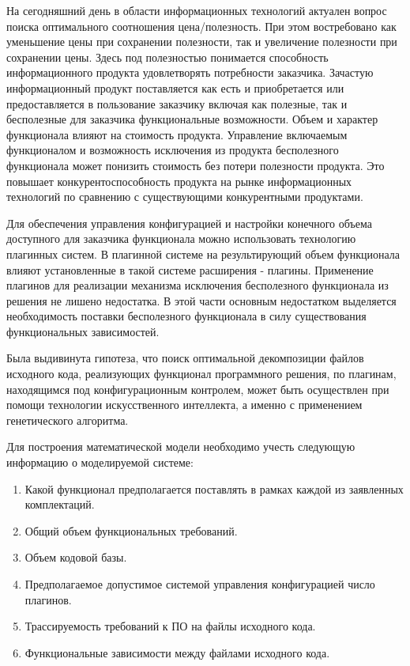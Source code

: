 На сегодняшний день в области информационных технологий актуален вопрос поиска оптимального соотношения цена/полезность. При этом востребовано как уменьшение цены при сохранении полезности, так и увеличение полезности при сохранении цены. Здесь под полезностью понимается способность информационного продукта удовлетворять потребности заказчика. Зачастую информационный продукт поставляется как есть и приобретается или предоставляется в пользование заказчику включая как полезные, так и бесполезные для заказчика функциональные возможности. Объем и характер функционала влияют на стоимость продукта. Управление включаемым функционалом и возможность исключения из продукта бесполезного функционала может понизить стоимость без потери полезности продукта. Это повышает конкурентоспособность продукта на рынке информационных технологий по сравнению с существующими конкурентными продуктами.

Для обеспечения управления конфигурацией и настройки конечного объема доступного для заказчика функционала можно использовать технологию плагинных систем. В плагинной системе на результирующий объем функционала влияют установленные в такой системе расширения - плагины. Применение плагинов для реализации механизма исключения бесполезного функционала из решения не лишено недостатка. В этой части основным недостатком выделяется необходимость поставки бесполезного функционала в силу существования функциональных зависимостей.

Была выдивинута гипотеза, что поиск оптимальной декомпозиции файлов исходного кода, реализующих функционал программного решения, по плагинам, находящимся под конфигурационным контролем, может быть осуществлен при помощи технологии искусственного интеллекта, а именно с применением генетического алгоритма.

Для построения математической модели необходимо учесть следующую информацию о моделируемой системе:
\begin{enumerate}
	\item Какой функционал предполагается поставлять в рамках каждой из заявленных комплектаций.
	\item Общий объем функциональных требований.
	\item Объем кодовой базы.
	\item Предполагаемое допустимое системой управления конфигурацией число плагинов.
	\item Трассируемость требований к ПО на файлы исходного кода.
	\item Функциональные зависимости между файлами исходного кода.
\end{enumerate}

